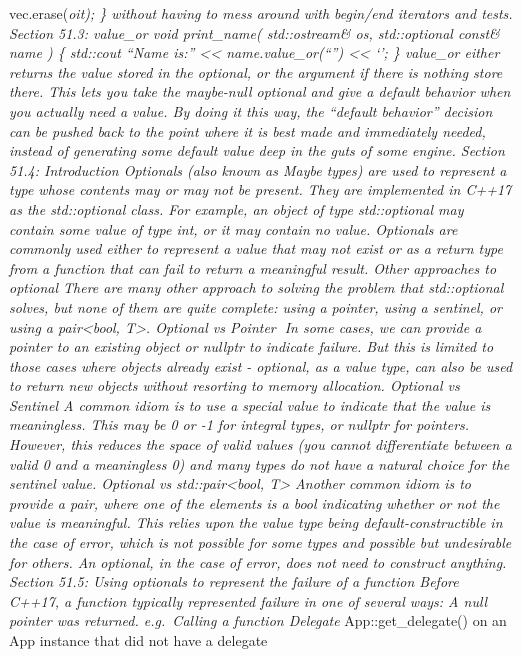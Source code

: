 vec.erase(\emph{oit); \} without having to mess around with begin/end
iterators and tests. Section 51.3: value\_or void print\_name(
std::ostream\& os, std::optional const\& name ) \{ std::cout ``Name
is:'' \textless\textless{} name.value\_or(``'') \textless\textless{}
`\n'; \} value\_or either returns the value stored in the optional, or
the argument if there is nothing store there. This lets you take the
maybe-null optional and give a default behavior when you actually need a
value. By doing it this way, the ``default behavior'' decision can be
pushed back to the point where it is best made and immediately needed,
instead of generating some default value deep in the guts of some
engine. Section 51.4: Introduction Optionals (also known as Maybe types)
are used to represent a type whose contents may or may not be present.
They are implemented in C++17 as the std::optional class. For example,
an object of type std::optional may contain some value of type int, or
it may contain no value. Optionals are commonly used either to represent
a value that may not exist or as a return type from a function that can
fail to return a meaningful result. Other approaches to optional There
are many other approach to solving the problem that std::optional
solves, but none of them are quite complete: using a pointer, using a
sentinel, or using a pair\textless bool, T\textgreater. Optional vs
Pointer In some cases, we can provide a pointer to an existing object
or nullptr to indicate failure. But this is limited to those cases where
objects already exist - optional, as a value type, can also be used to
return new objects without resorting to memory allocation. Optional vs
Sentinel A common idiom is to use a special value to indicate that the
value is meaningless. This may be 0 or -1 for integral types, or nullptr
for pointers. However, this reduces the space of valid values (you
cannot diﬀerentiate between a valid 0 and a meaningless 0) and many
types do not have a natural choice for the sentinel value. Optional vs
std::pair\textless bool, T\textgreater{} Another common idiom is to
provide a pair, where one of the elements is a bool indicating whether
or not the value is meaningful. This relies upon the value type being
default-constructible in the case of error, which is not possible for
some types and possible but undesirable for others. An optional, in the
case of error, does not need to construct anything. Section 51.5: Using
optionals to represent the failure of a function Before C++17, a
function typically represented failure in one of several ways: A null
pointer was returned. e.g.~Calling a function Delegate
}App::get\_delegate() on an App instance that did not have a delegate

